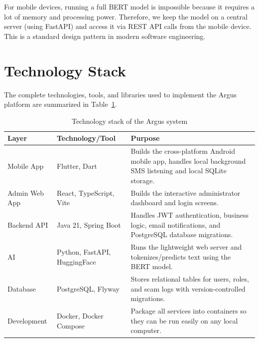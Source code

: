 For mobile devices, running a full BERT model is impossible because it requires a lot of memory and processing power. Therefore, we keep the model on a central server (using FastAPI) and access it via REST API calls from the mobile device. This is a standard design pattern in modern software engineering.

\section{Technology Stack}
The complete technologies, tools, and libraries used to implement the Argus platform are summarized in Table~\ref{tab:technology-stack}.

\begin{table}[htbp]
  \centering
  \caption{Technology stack of the Argus system}
  \label{tab:technology-stack}
  \begin{tabularx}{\textwidth}{p{} p{} X}
    \toprule
    \textbf{Layer} & \textbf{Technology/Tool} & \textbf{Purpose}\\
    \midrule
    Mobile App & Flutter, Dart & Builds the cross-platform Android mobile app, handles local background SMS listening and local SQLite storage.\\
    Admin Web App & React, TypeScript, Vite & Builds the interactive administrator dashboard and login screens.\\
    Backend API & Java 21, Spring Boot & Handles JWT authentication, business logic, email notifications, and PostgreSQL database migrations.\\
    AI & Python, FastAPI, HuggingFace & Runs the lightweight web server and tokenizes/predicts text using the BERT model.\\
    Database & PostgreSQL, Flyway & Stores relational tables for users, roles, and scam logs with version-controlled migrations.\\
    Development & Docker, Docker Compose & Package all services into containers so they can be run easily on any local computer.\\
    \bottomrule
  \end{tabularx}
\end{table}

